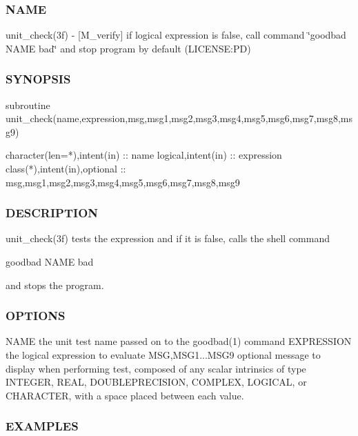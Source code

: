 \subsubsection*{N\+A\+ME}

unit\+\_\+check(3f) -\/ \mbox{[}M\+\_\+verify\mbox{]} if logical expression is false, call command \char`\"{}goodbad N\+A\+M\+E bad\char`\"{} and stop program by default (L\+I\+C\+E\+N\+SE\+:PD) 

\subsubsection*{S\+Y\+N\+O\+P\+S\+IS}

\begin{DoxyVerb}subroutine unit_check(name,expression,msg,msg1,msg2,msg3,msg4,msg5,msg6,msg7,msg8,msg9)

 character(len=*),intent(in) :: name
 logical,intent(in) :: expression
 class(*),intent(in),optional :: msg,msg1,msg2,msg3,msg4,msg5,msg6,msg7,msg8,msg9
\end{DoxyVerb}


\subsubsection*{D\+E\+S\+C\+R\+I\+P\+T\+I\+ON}

unit\+\_\+check(3f) tests the expression and if it is false, calls the shell command \begin{DoxyVerb} goodbad NAME bad
\end{DoxyVerb}


and stops the program. \subsubsection*{O\+P\+T\+I\+O\+NS}

N\+A\+ME the unit test name passed on to the goodbad(1) command E\+X\+P\+R\+E\+S\+S\+I\+ON the logical expression to evaluate M\+SG,M\+S\+G1...M\+S\+G9 optional message to display when performing test, composed of any scalar intrinsics of type I\+N\+T\+E\+G\+ER, R\+E\+AL, D\+O\+U\+B\+L\+E\+P\+R\+E\+C\+I\+S\+I\+ON, C\+O\+M\+P\+L\+EX, L\+O\+G\+I\+C\+AL, or C\+H\+A\+R\+A\+C\+T\+ER, with a space placed between each value.

\subsubsection*{E\+X\+A\+M\+P\+L\+ES}

